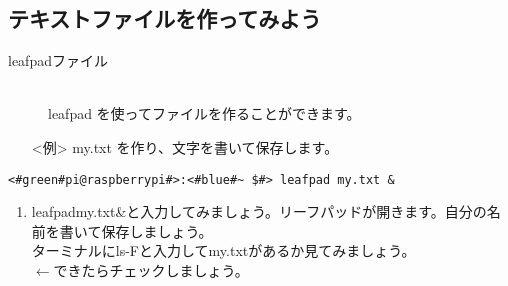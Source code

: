 \subsection{テキストファイルを作ってみよう}
\begin{description}
\item[leafpad\textvisiblespace ファイル]\mbox{}\\
leafpad を使ってファイルを作ることができます。
\end{description}
\begin{itemize}
\item[<例>]my.txt を作り、文字を書いて保存します。
\end{itemize}
\begin{lstlisting}[caption=leafpadの例, label=leafpad]
<#green#pi@raspberrypi#>:<#blue#~ $#> leafpad my.txt &
\end{lstlisting}
\begin{tcolorbox}[title=\useOmetoi]
\begin{enumerate}
\item leafpad\textvisiblespace my.txt\textvisiblespace \&と入力してみましょう。リーフパッドが開きます。自分の名前を書いて保存しましょう。\\
ターミナルにls\textvisiblespace -Fと入力してmy.txtがあるか見てみましょう。\\
\fbox{\phantom{白}} $\leftarrow$できたらチェックしましょう。
\end{enumerate}
\end{tcolorbox}